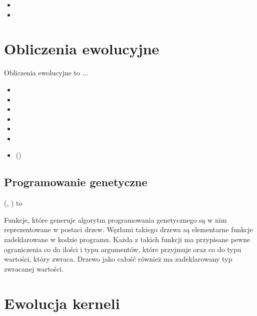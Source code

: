\begin{itemize}
\item {}
\item {}
\end{itemize}

\section{Obliczenia ewolucyjne}

Obliczenia ewolucyjne to ...

\begin{itemize}
\item {}
\item {}
\item {}
\item {}
\item {}
\item {}
\item {} ()
\end{itemize}

\subsection{Programowanie genetyczne}
 (, ) to 

Funkcje, które generuje algorytm programowania genetycznego są w nim reprezentowane w postaci drzew. Węzłami takiego drzewa są elementarne funkcje zadeklarowane w kodzie programu. Każda z takich funkcji ma przypisane pewne ograniczenia co do ilości i typu argumentów, które przyjmuje oraz co do typu wartości, który zwraca. Drzewo jako całość również ma zadeklarowany typ zwracanej wartości.

\section{Ewolucja kerneli}

\clearpage